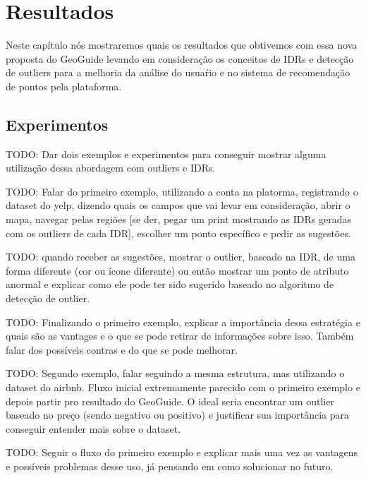 \chapter{Resultados}

Neste capítulo nós mostraremos quais os resultados que obtivemos com essa nova proposta do GeoGuide levando em consideração os conceitos de IDRs e detecção de outliers para a melhoria da análise do usuaŕio e no sistema de recomendação de pontos pela plataforma.

\section{Experimentos}

TODO: Dar dois exemplos e experimentos para conseguir mostrar alguma utilização dessa abordagem com outliers e IDRs.

TODO: Falar do primeiro exemplo, utilizando a conta na platorma, registrando o dataset do yelp, dizendo quais os campos que vai levar em consideração, abrir o mapa, navegar pelas regiões [se der, pegar um print mostrando as IDRs geradas com os outliers de cada IDR], escolher um ponto específico e pedir as sugestões.

TODO: quando receber as sugestões, mostrar o outlier, baseado na IDR, de uma forma diferente (cor ou ícone diferente) ou então mostrar um ponto de atributo anormal e explicar como ele pode ter sido sugerido baseado no algoritmo de detecção de outlier.

TODO: Finalizando o primeiro exemplo, explicar a importância dessa estratégia e quais são as vantages e o que se pode retirar de informações sobre isso. Também falar dos possíveis contras e do que se pode melhorar.



TODO: Segundo exemplo, falar seguindo a mesma estrutura, mas utilizando o dataset do airbnb. Fluxo inicial extremamente parecido com o primeiro exemplo e depois partir pro resultado do GeoGuide. O ideal seria encontrar um outlier baseado no preço (sendo negativo ou positivo) e justificar sua importância para conseguir entender mais sobre o dataset.

TODO: Seguir o fluxo do primeiro exemplo e explicar mais uma vez as vantagens e possíveis problemas desse uso, já pensando em como solucionar no futuro.